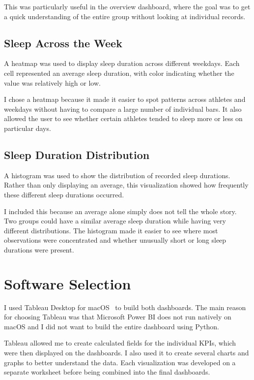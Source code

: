 \documentclass[11pt,a4paper]{article}
\begin{document}
This was particularly useful in the overview dashboard, where the goal was to get a quick understanding of the entire group without looking at individual records.

\subsection*{Sleep Across the Week}

A heatmap was used to display sleep duration across different weekdays. Each cell represented an average sleep duration, with color indicating whether the value was relatively high or low.

I chose a heatmap because it made it easier to spot patterns across athletes and weekdays without having to compare a large number of individual bars. It also allowed the user to see whether certain athletes tended to sleep more or less on particular days.

\subsection*{Sleep Duration Distribution}

A histogram was used to show the distribution of recorded sleep durations. Rather than only displaying an average, this visualization showed how frequently these different sleep durations occurred.

I included this because an average alone simply does not tell the whole story. Two groups could have a similar average sleep duration while having very different distributions. The histogram made it easier to see where most observations were concentrated and whether unusually short or long sleep durations were present.

\section{Software Selection}
\label{sec:software}

I used Tableau Desktop for macOS~\cite{tableau2026} to build both dashboards. The main reason for choosing Tableau was that Microsoft
Power BI does not run natively on macOS and I did not want to build the entire dashboard using Python.

Tableau allowed me to create calculated fields for the individual KPIs, which were then displayed on the dashboards. I also used it to create several charts and graphs to better understand the data. Each visualization was developed on a separate worksheet before being combined into the final dashboards.
\end{document}
